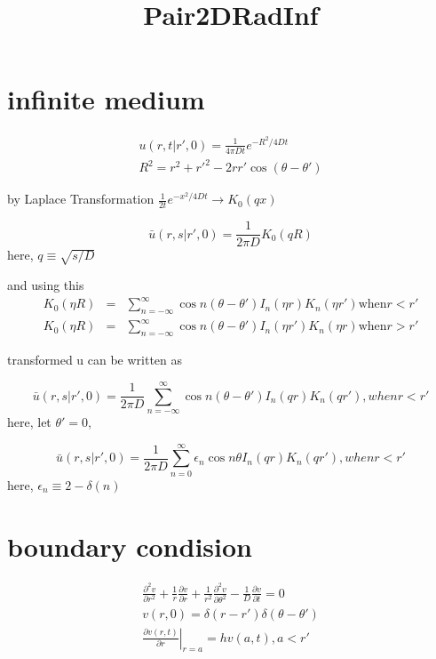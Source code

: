 \documentclass{article}
\begin{document}
\title{Pair2DRadInf}
\maketitle
\section{infinite medium}

\begin{eqnarray}
    u(r,t|r',0)=\frac{1}{4\pi Dt}e^{-R^2/4Dt} \nonumber \\
    R^2=r^2+r'^2-2rr'\cos(\theta-\theta') \nonumber
\end{eqnarray}

by Laplace Transformation $\frac{1}{2t}e^{-x^2/4Dt}\rightarrow K_0(qx)$

\begin{equation}
    \bar{u}(r,s|r',0)=\frac{1}{2\pi D}K_0(qR)
\end{equation}
here, 
$q\equiv\sqrt{s/D}$

and using this
\begin{eqnarray}
    K_0(\eta R)&=&\sum_{n=-\infty}^{\infty}\cos n(\theta-\theta')I_n(\eta r)K_n(\eta r') \mathrm{when} r<r' \nonumber \\
    K_0(\eta R)&=&\sum_{n=-\infty}^{\infty}\cos n(\theta-\theta')I_n(\eta r')K_n(\eta r) \mathrm{when} r>r' 
\end{eqnarray}

transformed u can be written as

\begin{equation}
    \bar{u}(r,s|r',0)=\frac{1}{2\pi D}\sum_{n=-\infty}^{\infty}\cos n(\theta-\theta')I_n(qr)K_n(qr'), when r<r'
\end{equation}
here, let $\theta'=0$, 

\begin{equation}
\bar{u}(r,s|r',0)=\frac{1}{2\pi D}\sum_{n=0}^{\infty}\epsilon_n\cos n\theta I_n(qr)K_n(qr'), when r<r'
\end{equation}
here, $\epsilon_n \equiv 2-\delta(n)$

\section{boundary condision}

\begin{eqnarray}
    \frac{\partial^2 v}{\partial r^2}+\frac{1}{r}\frac{\partial v}{\partial r}+\frac{1}{r^2}\frac{\partial^2 v}{\partial\theta^2}-\frac{1}{D}\frac{\partial v}{\partial t}=0 \nonumber \\
    v(r,0)=\delta(r-r')\delta(\theta-\theta') \nonumber \\
    \left.\frac{\partial v(r,t)}{\partial r}\right|_{r=a}=hv(a,t), a<r' \nonumber
\end{eqnarray}
\end{document}
